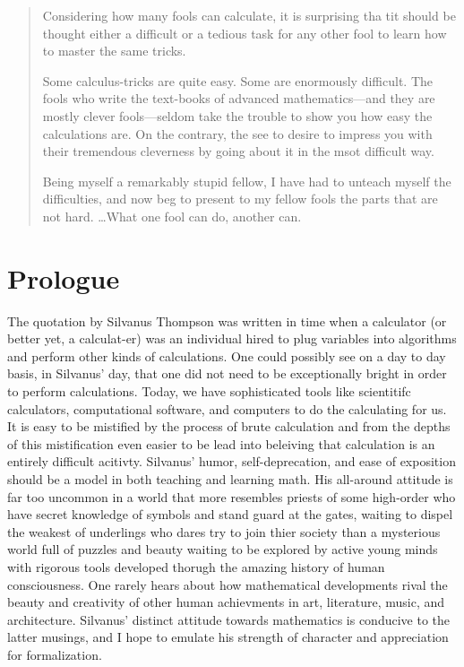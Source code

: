 \documentclass{book}
\begin{document}
\begin{quotation}
    Considering how many fools can calculate, it is surprising tha tit should be thought either a difficult or a tedious task for any other fool to learn how to master the same tricks.

Some calculus-tricks are quite easy. Some are enormously difficult. The fools who write the text-books of advanced mathematics---and they are mostly clever fools---seldom take the trouble to show you how easy the calculations are. On the contrary, the see to desire to impress you with their tremendous cleverness by going about it in the msot difficult way.

Being myself a remarkably stupid fellow, I have had to unteach myself the difficulties, and now beg to present to my fellow fools the parts that are not hard. \ldots What one fool can do, another can.
\end{quotation}

\chapter*{Prologue}
 The quotation by Silvanus Thompson was written in time when a calculator (or better yet, a calculat-er) was an individual hired to plug variables into algorithms and perform other kinds of calculations. One could possibly see on a day to day basis, in Silvanus' day, that one did not need to be exceptionally bright in order to perform calculations. Today, we have sophisticated tools like scientitifc calculators, computational software, and computers to do the calculating for us. It is easy to be mistified by the process of brute calculation and from the depths of this mistification even easier to be lead into beleiving that calculation is an entirely difficult acitivty. Silvanus' humor, self-deprecation, and ease of exposition should be a model in both teaching and learning math. His all-around attitude is far too uncommon in a world that more resembles priests of some high-order who have secret knowledge of symbols and stand guard at the gates, waiting to dispel the weakest of underlings who dares try to join thier society than a mysterious world full of puzzles and beauty waiting to be explored by active young minds with rigorous tools developed thorugh the amazing history of human consciousness. One rarely hears about how mathematical developments rival the beauty and creativity of other human achievments in art, literature, music, and architecture. Silvanus' distinct attitude towards mathematics is conducive to the latter musings, and I hope to emulate his strength of character and appreciation for formalization.
\end{document}
